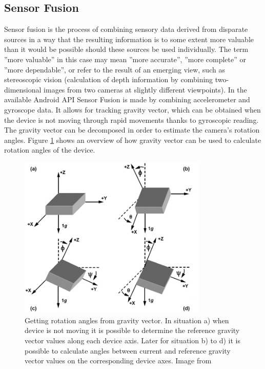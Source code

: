 \subsection[Sensor Fusion]{Sensor Fusion\cite{website:sensorFustion}}
Sensor fusion is the process of combining sensory data derived from disparate sources in a way that the resulting information is to some extent more valuable than it would be possible should these sources be used individually. The term ''more valuable'' in this case may mean ''more accurate'', ''more complete'' or ''more dependable'', or refer to the result of an emerging view, such as stereoscopic vision (calculation of depth information by combining two-dimensional images from two cameras at slightly different viewpoints). 
In the available Android API Sensor Fusion is made by combining accelerometer and gyroscope data. It allows for tracking gravity vector, which can be obtained when the device is not moving through rapid movements thanks to gyroscopic reading. The gravity vector can be decomposed in order to estimate the camera's rotation angles. Figure \ref{fig:angles_from_gravity} shows an overview of how gravity vector can be used to calculate rotation angles of the device. 
\begin{figure}[h!]
    \centering
    \includegraphics[width=0.8\textwidth]{angles_from_gravity}
    \caption[Getting rotation angles from gravity vector]{Getting rotation angles from gravity vector. In situation a) when device is not moving it is possible to determine the reference gravity vector values along each device axis. Later for situation b) to d) it is possible to calculate angles between current and reference gravity vector values on the corresponding device axes. Image from \cite{website:gravity_orientation}}
    \label{fig:angles_from_gravity}
\end{figure}

